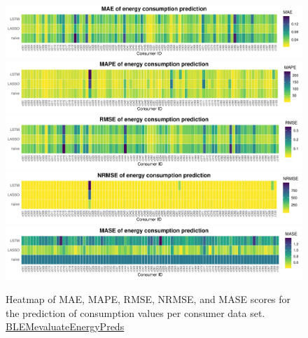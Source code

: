 %
\begin{figure}[htbp]
 \centering
 \includegraphics[width=\textwidth]{thesis/graphs/evaluation/c_heatmap_MAE.pdf}
 \includegraphics[width=\textwidth]{thesis/graphs/evaluation/c_heatmap_MAPE.pdf}
 \includegraphics[width=\textwidth]{thesis/graphs/evaluation/c_heatmap_RMSE.pdf}
 \includegraphics[width=\textwidth]{thesis/graphs/evaluation/c_heatmap_NRMSE.pdf}
 \includegraphics[width=\textwidth]{thesis/graphs/evaluation/c_heatmap_MASE.pdf}
\caption[Heatmaps of all error measures for consumption values]{Heatmap of MAE, MAPE, RMSE, NRMSE, and MASE scores for the prediction of consumption values per consumer data set. \quantnet\href{ }{BLEMevaluateEnergyPreds}}
\label{Fig:heatmaps}
\end{figure}
%

